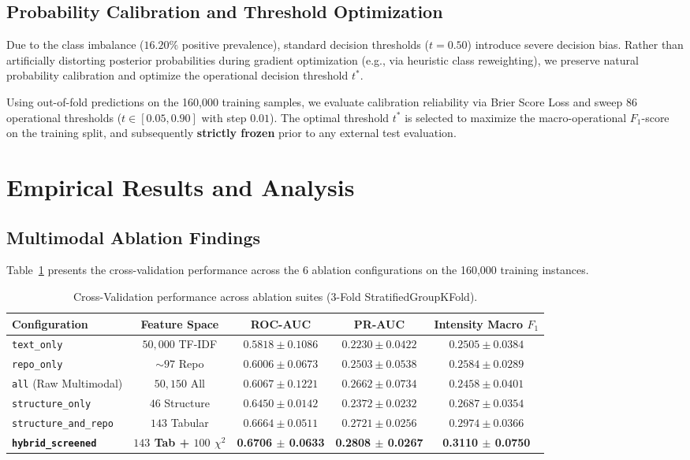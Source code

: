 \documentclass[12pt]{article}
\begin{document}
\subsection{Probability Calibration and Threshold Optimization}
Due to the class imbalance ($16.20\%$ positive prevalence), standard decision thresholds ($t = 0.50$) introduce severe decision bias. Rather than artificially distorting posterior probabilities during gradient optimization (e.g., via heuristic class reweighting), we preserve natural probability calibration and optimize the operational decision threshold $t^*$.

Using out-of-fold predictions on the 160,000 training samples, we evaluate calibration reliability via Brier Score Loss and sweep 86 operational thresholds ($t \in [0.05, 0.90]$ with step $0.01$). The optimal threshold $t^*$ is selected to maximize the macro-operational $F_1$-score on the training split, and subsequently \textbf{strictly frozen} prior to any external test evaluation.

\section{Empirical Results and Analysis}

\subsection{Multimodal Ablation Findings}
Table~\ref{tab:ablation_cv} presents the cross-validation performance across the 6 ablation configurations on the 160,000 training instances.

\begin{table}[ht]
\centering
\caption{Cross-Validation performance across ablation suites (3-Fold StratifiedGroupKFold).}
\label{tab:ablation_cv}
\small
\begin{tabular}{lcccc}
\toprule
\textbf{Configuration} & \textbf{Feature Space} & \textbf{ROC-AUC} & \textbf{PR-AUC} & \textbf{Intensity Macro $F_1$} \\
\midrule
\texttt{text\_only} & $50,000$ TF-IDF & $0.5818 \pm 0.1086$ & $0.2230 \pm 0.0422$ & $0.2505 \pm 0.0384$ \\
\texttt{repo\_only} & $\sim 97$ Repo & $0.6006 \pm 0.0673$ & $0.2503 \pm 0.0538$ & $0.2584 \pm 0.0289$ \\
\texttt{all} (Raw Multimodal) & $50,150$ All & $0.6067 \pm 0.1221$ & $0.2662 \pm 0.0734$ & $0.2458 \pm 0.0401$ \\
\texttt{structure\_only} & $46$ Structure & $0.6450 \pm 0.0142$ & $0.2372 \pm 0.0232$ & $0.2687 \pm 0.0354$ \\
\texttt{structure\_and\_repo} & $143$ Tabular & $0.6664 \pm 0.0511$ & $0.2721 \pm 0.0256$ & $0.2974 \pm 0.0366$ \\
\textbf{\texttt{hybrid\_screened}} & \textbf{$143$ Tab + $100$ $\chi^2$} & \textbf{0.6706 $\pm$ 0.0633} & \textbf{0.2808 $\pm$ 0.0267} & \textbf{0.3110 $\pm$ 0.0750} \\
\bottomrule
\end{tabular}
\end{table}
\end{document}
